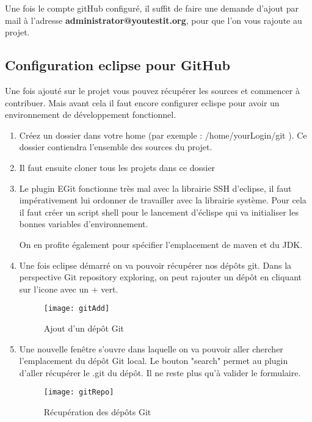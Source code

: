 Une fois le compte gitHub configuré, il suffit de faire une demande d'ajout par mail à l'adresse
\textbf{administrator@youtestit.org}, pour que l'on vous rajoute au projet.

\subsection{Configuration eclipse pour GitHub}
Une fois ajouté sur le projet  vous pouvez récupérer les sources et commencer à contribuer. 
Mais avant cela il faut encore configurer eclispe pour avoir un environnement de développement
fonctionnel. 

\begin{enumerate}
	\item Créez un dossier dans votre home (par exemple : /home/yourLogin/git ). Ce dossier contiendra
	 l'ensemble des sources du projet.
	 
	\item Il faut ensuite cloner tous les projets dans ce dossier
	 
	 
	 \item Le plugin EGit fonctionne très mal avec la librairie SSH d'eclipse, il faut impérativement lui
	 ordonner de travailler avec la librairie système. Pour cela il faut créer un script shell pour le lancement
	 d'éclispe qui va initialiser les bonnes variables d'environnement.
	 
	 
	On en profite également pour spécifier l'emplacement de maven et du JDK.
	\newpage

	 \item Une fois eclipse démarré on va pouvoir récupérer nos dépôts git. Dans la perspective
	 Git repository exploring, on peut rajouter un dépôt en cliquant sur l'icone avec un + vert.
		\begin{figure}[!h]
     		\begin{center}
			      \texttt{[image: gitAdd]}
			      \caption{Ajout d'un dépôt Git}
			      \label{gitAdd}
		    \end{center}
		\end{figure}
		
	 \item Une nouvelle fenêtre s'ouvre dans laquelle on va pouvoir aller chercher  l'emplacement du
	 dépôt Git local. Le bouton "search" permet au plugin d'aller récupérer le .git du dépôt. Il ne 
	 reste plus qu'à valider le formulaire.
		\begin{figure}[!h]
     		\begin{center}
			      \texttt{[image: gitRepo]}
			      \caption{Récupération des dépôts Git}
			      \label{gitAddRepo}
		    \end{center}
		\end{figure}
		\newpage
	 

\end{enumerate}
